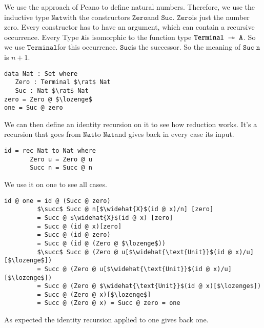 \documentclass[a4paper,cleardoubleempty,BCOR1cm]{scrbook}
\begin{document}
We use the approach of Peano to define natural numbers.  Therefore, we use
the inductive type $\mathtt{Nat}$\;with the constructors $\mathtt{Zero}$\;and $\mathtt{Suc}$. $\mathtt{Zero}$\;is
just the number zero. Every constructor has to have an argument, which can
contain a recursive occurrence. Every Type $\mathtt{A}$\;is isomorphic to the
function type $\mathtt{Terminal\;\rightarrowtriangle\;A}$. So we use $\mathtt{Terminal}$\;for this occurrence.
$\mathtt{Suc}$\;is the successor. So the meaning of $\mathtt{Suc\;n}$\;is \(n+1\).
\begin{lstlisting}
data Nat : Set where
   Zero : Terminal $\rat$ Nat
   Suc : Nat $\rat$ Nat
zero = Zero @ $\lozenge$
one = Suc @ zero
\end{lstlisting}
We can then define an identity recursion on it to see how reduction works.
It's a recursion that goes from $\mathtt{Nat}$\;to $\mathtt{Nat}$\;and gives back in every
case its input.
\begin{lstlisting}
id = rec Nat to Nat where
       Zero u = Zero @ u
       Succ n = Succ @ n
\end{lstlisting}

We use it on one to see all cases.
\begin{lstlisting}
id @ one = id @ (Succ @ zero)
         $\succ$ Succ @ n[$\widehat{X}$(id @ x)/n] [zero]
         = Succ @ $\widehat{X}$(id @ x) [zero]
         = Succ @ (id @ x)[zero]
         = Succ @ (id @ zero)
         = Succ @ (id @ (Zero @ $\lozenge$))
         $\succ$ Succ @ (Zero @ u[$\widehat{\text{Unit}}$(id @ x)/u][$\lozenge$])
         = Succ @ (Zero @ u[$\widehat{\text{Unit}}$(id @ x)/u][$\lozenge$])
         = Succ @ (Zero @ $\widehat{\text{Unit}}$(id @ x)[$\lozenge$])
         = Succ @ (Zero @ x)[$\lozenge$]
         = Succ @ (Zero @ x) = Succ @ zero = one
\end{lstlisting}
As expected the identity recursion applied to one gives back one.
\end{document}
